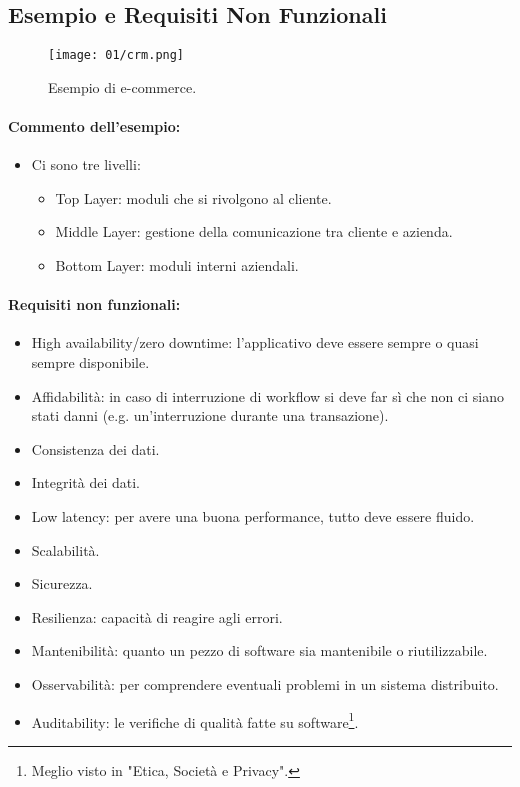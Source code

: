 \subsection{Esempio e Requisiti Non Funzionali}

\begin{figure}[h]
    \centering
    \texttt{[image: 01/crm.png]}
    \caption{Esempio di e-commerce.}
\end{figure}

\paragraph{Commento dell'esempio:}

\begin{itemize}
  \item Ci sono tre livelli: 
    \begin{itemize}
      \item Top Layer: moduli che si rivolgono al cliente.
      \item Middle Layer: gestione della comunicazione tra cliente e azienda. 
      \item Bottom Layer: moduli interni aziendali.
    \end{itemize}
\end{itemize}

\paragraph{Requisiti non funzionali:}

\begin{itemize}
  \item High availability/zero downtime: l'applicativo deve essere sempre o quasi sempre disponibile. 
  \item Affidabilità: in caso di interruzione di workflow si deve far sì che non ci siano stati danni (e.g. un'interruzione durante una transazione). 
  \item Consistenza dei dati. 
  \item Integrità dei dati. 
  \item Low latency: per avere una buona performance, tutto deve essere fluido. 
  \item Scalabilità.
  \item Sicurezza. 
  \item Resilienza: capacità di reagire agli errori. 
  \item Mantenibilità: quanto un pezzo di software sia mantenibile o riutilizzabile.
  \item Osservabilità: per comprendere eventuali problemi in un sistema distribuito. 
  \item Auditability: le verifiche di qualità fatte su software\footnote{Meglio visto in "Etica, Società e Privacy".}.
\end{itemize}

